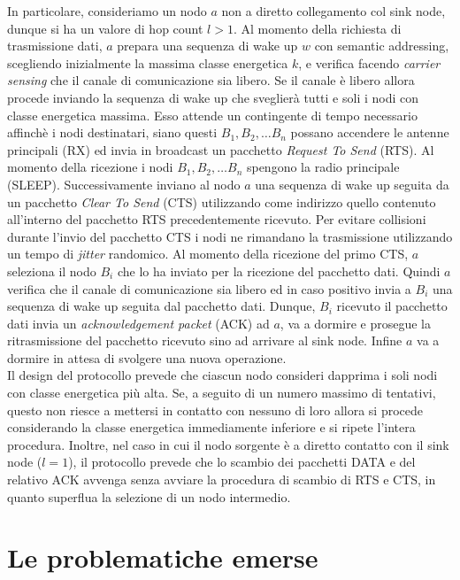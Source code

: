 \documentclass{report}
\begin{document}
In particolare,
consideriamo un nodo $a$ non a diretto collegamento col sink node, dunque si ha un valore di hop count $l>1$. Al momento della richiesta di trasmissione dati,
$a$ prepara una sequenza di wake up $w$ con semantic addressing, scegliendo inizialmente la massima classe energetica $k$, e verifica facendo
\emph{carrier sensing} che il canale di comunicazione sia libero. Se il canale è libero allora procede inviando la sequenza di wake up che sveglierà tutti
e soli i nodi con classe energetica massima. Esso attende un contingente di tempo necessario affinchè i nodi destinatari, siano questi $B_1, B_2, \ldots B_n$
possano accendere le antenne principali (RX) ed invia in broadcast un pacchetto \emph{Request To Send} (RTS). Al momento della ricezione
i nodi $B_1, B_2, \ldots B_n$ spengono la radio principale (SLEEP). Successivamente inviano al nodo $a$ una sequenza di wake up seguita da un pacchetto
\emph{Clear To Send} (CTS) utilizzando come indirizzo quello contenuto all'interno del pacchetto RTS precedentemente ricevuto. Per evitare collisioni
durante l'invio del pacchetto CTS i nodi ne rimandano la trasmissione utilizzando un tempo di \emph{jitter} randomico.
Al momento della ricezione del primo CTS, $a$ seleziona il nodo $B_i$ che lo ha inviato per la ricezione del pacchetto dati.
Quindi $a$ verifica che il canale di comunicazione sia libero ed in caso positivo invia a $B_i$ una sequenza di wake up
seguita dal pacchetto dati. Dunque, $B_i$ ricevuto il pacchetto dati invia un \emph{acknowledgement packet} (ACK) ad $a$, va a dormire e prosegue la
ritrasmissione del pacchetto ricevuto sino ad arrivare al sink node. Infine $a$ va a dormire in attesa di svolgere una nuova operazione.\\

Il design del protocollo prevede che ciascun nodo consideri dapprima i soli nodi con classe energetica più alta. Se, a seguito di un numero massimo di tentativi,
questo non riesce a mettersi in contatto con nessuno di loro allora si procede considerando la classe energetica immediamente inferiore e si ripete
l'intera procedura. Inoltre, nel caso in cui il nodo sorgente è a diretto contatto con il sink node ($l=1$), il protocollo prevede che
lo scambio dei pacchetti DATA e del relativo ACK avvenga senza avviare la procedura di scambio di RTS e CTS, in quanto superflua la
selezione di un nodo intermedio.\\

\section{Le problematiche emerse}
\end{document}

